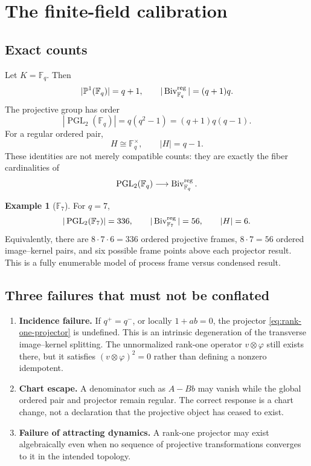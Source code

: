 \documentclass[11pt]{article}
\theoremstyle{definition}
\newtheorem{example}[theorem]{Example}
\theoremstyle{remark}
\newcommand{\PGL}{\operatorname{PGL}}
\newcommand{\Biv}{\operatorname{Biv}}
\newcommand{\PP}{\mathbb P}
\newcommand{\F}{\mathbb F}
\begin{document}
\section{The finite-field calibration}

\subsection{Exact counts}

Let \(K=\F_q\).  Then
\[
|\PP^1(\F_q)|=q+1,
\qquad
|\Biv_{\F_q}^{\rm reg}|=(q+1)q.
\]
The projective group has order
\[
|\PGL_2(\F_q)|=q(q^2-1)=(q+1)q(q-1).
\]
For a regular ordered pair,
\[
H\cong\F_q^\times,
\qquad |H|=q-1.
\]
These identities are not merely compatible counts: they are exactly the
fiber cardinalities of
\[
\PGL_2(\F_q)\longrightarrow
\Biv_{\F_q}^{\rm reg}.
\]

\begin{example}[\(\F_7\)]
For \(q=7\),
\[
|\PGL_2(\F_7)|=336,
\qquad
|\Biv_{\F_7}^{\rm reg}|=56,
\qquad
|H|=6.
\]
Equivalently, there are \(8\cdot7\cdot6=336\) ordered projective frames,
\(8\cdot7=56\) ordered image--kernel pairs, and six possible frame points
above each projector result.  This is a fully enumerable model of process
frame versus condensed result.
\end{example}

\subsection{Three failures that must not be conflated}

\begin{enumerate}
  \item \textbf{Incidence failure.}
  If \(q^+=q^-\), or locally \(1+ab=0\), the projector
  \eqref{eq:rank-one-projector} is undefined.  This is an intrinsic
  degeneration of the transverse image--kernel splitting.  The unnormalized
  rank-one operator \(v\otimes\varphi\) still exists there, but it satisfies
  \((v\otimes\varphi)^2=0\) rather than defining a nonzero idempotent.

  \item \textbf{Chart escape.}
  A denominator such as \(A-Bb\) may vanish while the global ordered pair and
  projector remain regular.  The correct response is a chart change, not a
  declaration that the projective object has ceased to exist.

  \item \textbf{Failure of attracting dynamics.}
  A rank-one projector may exist algebraically even when no sequence of
  projective transformations converges to it in the intended topology.
\end{enumerate}
\end{document}
